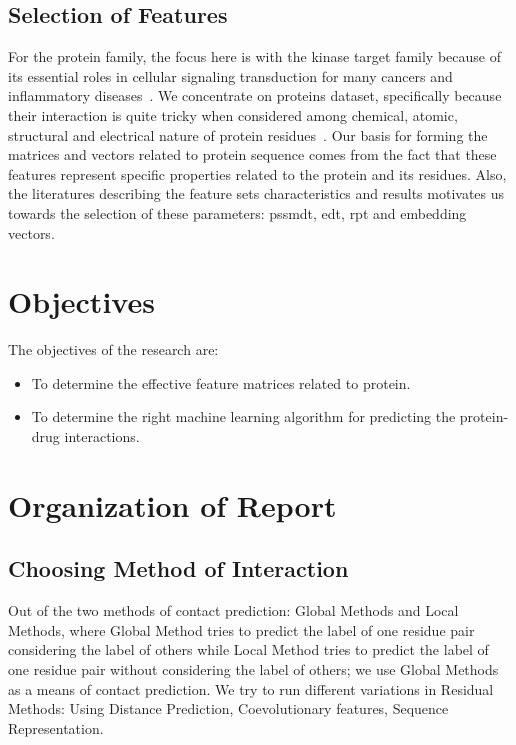 \subsection{Selection of Features}

For the protein family, the focus here is with the kinase target family because of its essential roles in cellular signaling transduction for many cancers and inflammatory diseases~\cite{Tang2013,Kanehisa2000}. We concentrate on proteins dataset, specifically because their interaction is quite tricky when considered among chemical, atomic, structural and electrical nature of protein residues~\cite{Mathai2019}. Our basis for forming the matrices and vectors related to protein sequence comes from the fact that these features represent specific properties related to the protein and its residues. Also, the literatures describing the feature sets characteristics and results motivates us towards the selection of these parameters: \acrshort{pssmdt}, \acrshort{edt}, \acrshort{rpt} and embedding vectors.


\section{Objectives}
The objectives of the research are:
\begin{itemize}
    \setlength\parindent{36pt}
    \item To determine the effective feature matrices related to protein.
    \item To determine the right machine learning algorithm for predicting the protein-drug interactions.
\end{itemize}




\section{Organization of Report}

\subsection{Choosing Method of Interaction}
Out of the two methods of contact prediction: Global Methods and Local Methods, where Global Method tries to predict the label of one residue pair considering the label of others while Local Method tries to predict the label of one residue pair without considering the label of others; we use Global Methods as a means of contact prediction. We try to run different variations in Residual Methods: Using Distance Prediction, Coevolutionary features, Sequence Representation. 

